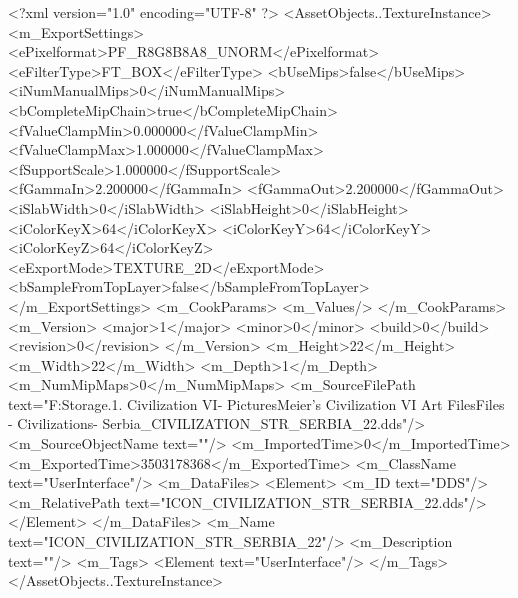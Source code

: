 <?xml version="1.0" encoding="UTF-8" ?>
<AssetObjects..TextureInstance>
	<m_ExportSettings>
		<ePixelformat>PF_R8G8B8A8_UNORM</ePixelformat>
		<eFilterType>FT_BOX</eFilterType>
		<bUseMips>false</bUseMips>
		<iNumManualMips>0</iNumManualMips>
		<bCompleteMipChain>true</bCompleteMipChain>
		<fValueClampMin>0.000000</fValueClampMin>
		<fValueClampMax>1.000000</fValueClampMax>
		<fSupportScale>1.000000</fSupportScale>
		<fGammaIn>2.200000</fGammaIn>
		<fGammaOut>2.200000</fGammaOut>
		<iSlabWidth>0</iSlabWidth>
		<iSlabHeight>0</iSlabHeight>
		<iColorKeyX>64</iColorKeyX>
		<iColorKeyY>64</iColorKeyY>
		<iColorKeyZ>64</iColorKeyZ>
		<eExportMode>TEXTURE_2D</eExportMode>
		<bSampleFromTopLayer>false</bSampleFromTopLayer>
	</m_ExportSettings>
	<m_CookParams>
		<m_Values/>
	</m_CookParams>
	<m_Version>
		<major>1</major>
		<minor>0</minor>
		<build>0</build>
		<revision>0</revision>
	</m_Version>
	<m_Height>22</m_Height>
	<m_Width>22</m_Width>
	<m_Depth>1</m_Depth>
	<m_NumMipMaps>0</m_NumMipMaps>
	<m_SourceFilePath text="F:\Mod Storage\2.1. Civilization VI\Mods\Archive - Pictures\Sid Meier's Civilization VI Art Files\Art Files - Civilizations\Civilization - Serbia\ICON_CIVILIZATION_STR_SERBIA_22.dds"/>
	<m_SourceObjectName text=""/>
	<m_ImportedTime>0</m_ImportedTime>
	<m_ExportedTime>3503178368</m_ExportedTime>
	<m_ClassName text="UserInterface"/>
	<m_DataFiles>
		<Element>
			<m_ID text="DDS"/>
			<m_RelativePath text="ICON_CIVILIZATION_STR_SERBIA_22.dds"/>
		</Element>
	</m_DataFiles>
	<m_Name text="ICON_CIVILIZATION_STR_SERBIA_22"/>
	<m_Description text=""/>
	<m_Tags>
		<Element text="UserInterface"/>
	</m_Tags>
</AssetObjects..TextureInstance>

